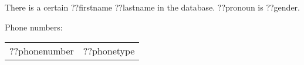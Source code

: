 \documentclass[a4paper]{article}
\begin{document}
\newcommand{\texdbconnectionnet}[2]{}
\newcommand{\texdbdef}[3]{}
\newcommand{\texdbfor}[2]{#2}
\newcommand{\texdbif}[2]{#2}
\newcommand{\texdbcommand}[1]{}
\texdbconnectionnet{Mono.Data.Sqlite}{URI=file:kleinertest.db3}
\texdbdef{??personqry}{select id, firstname, lastname, gender, gender from person}{??id,??firstname,??lastname,??gender/m/male/f/female,??pronoun/m/He/f/She}
\texdbdef{??phoneqry}{select phonenumber, phonetype from telephone where fk_person = ??id}{??phonenumber,??phonetype}
\texdbfor{??personqry}{There is a certain ??firstname ??lastname in the database. ??pronoun is ??gender.

\texdbif{??phoneqry}{
Phone numbers:

  \begin{tabular}{ll}
\texdbfor{??phoneqry}{??phonenumber & ??phonetype \\}
\end{tabular}
}}
\end{document}
